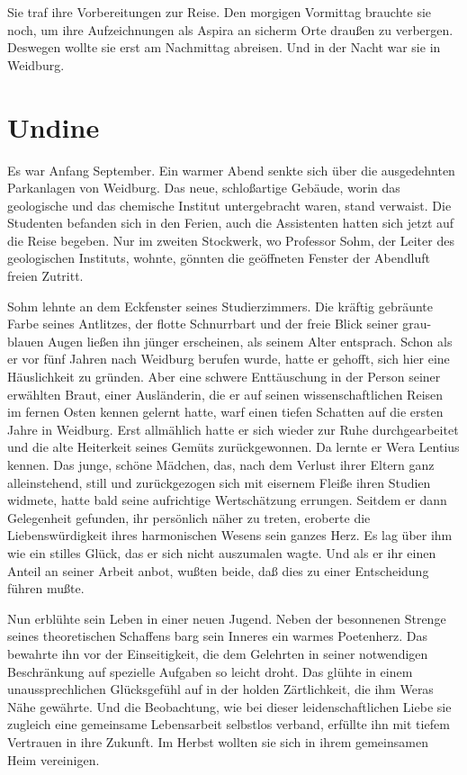 Sie traf ihre Vorbereitungen zur Reise. Den morgigen Vormittag
brauchte sie noch, um ihre Aufzeichnungen als Aspira an sicherm
Orte draußen zu verbergen. Deswegen wollte sie erst am Nachmittag
abreisen. Und in der Nacht war sie in Weidburg.

\section{Undine}

Es war Anfang September. Ein warmer Abend senkte sich über die
ausgedehnten Parkanlagen von Weidburg. Das neue, schloßartige
Gebäude, worin das geologische und das chemische Institut
untergebracht waren, stand verwaist. Die Studenten befanden sich in
den Ferien, auch die Assistenten hatten sich jetzt auf die Reise
begeben. Nur im zweiten Stockwerk, wo Professor Sohm, der Leiter
des geologischen Instituts, wohnte, gönnten die geöffneten Fenster
der Abendluft freien Zutritt.

Sohm lehnte an dem Eckfenster seines Studierzimmers. Die kräftig
gebräunte Farbe seines Antlitzes, der flotte Schnurrbart und der
freie Blick seiner grau-blauen Augen ließen ihn jünger erscheinen,
als seinem Alter entsprach. Schon als er vor fünf Jahren nach
Weidburg berufen wurde, hatte er gehofft, sich hier eine
Häuslichkeit zu gründen. Aber eine schwere Enttäuschung in der
Person seiner erwählten Braut, einer Ausländerin, die er auf seinen
wissenschaftlichen Reisen im fernen Osten kennen gelernt hatte,
warf einen tiefen Schatten auf die ersten Jahre in Weidburg. Erst
allmählich hatte er sich wieder zur Ruhe durchgearbeitet und die
alte Heiterkeit seines Gemüts zurückgewonnen. Da lernte er Wera
Lentius kennen. Das junge, schöne Mädchen, das, nach dem Verlust
ihrer Eltern ganz alleinstehend, still und zurückgezogen sich mit
eisernem Fleiße ihren Studien widmete, hatte bald seine aufrichtige
Wertschätzung errungen. Seitdem er dann Gelegenheit gefunden, ihr
persönlich näher zu treten, eroberte die Liebenswürdigkeit ihres
harmonischen Wesens sein ganzes Herz. Es lag über ihm wie ein
stilles Glück, das er sich nicht auszumalen wagte. Und als er ihr
einen Anteil an seiner Arbeit anbot, wußten beide, daß dies zu
einer Entscheidung führen mußte.

Nun erblühte sein Leben in einer neuen Jugend. Neben der besonnenen
Strenge seines theoretischen Schaffens barg sein Inneres ein warmes
Poetenherz. Das bewahrte ihn vor der Einseitigkeit, die dem
Gelehrten in seiner notwendigen Beschränkung auf spezielle Aufgaben
so leicht droht. Das glühte in einem unaussprechlichen Glücksgefühl
auf in der holden Zärtlichkeit, die ihm Weras Nähe gewährte. Und
die Beobachtung, wie bei dieser leidenschaftlichen Liebe sie
zugleich eine gemeinsame Lebensarbeit selbstlos verband, erfüllte
ihn mit tiefem Vertrauen in ihre Zukunft. Im Herbst wollten sie
sich in ihrem gemeinsamen Heim vereinigen.

